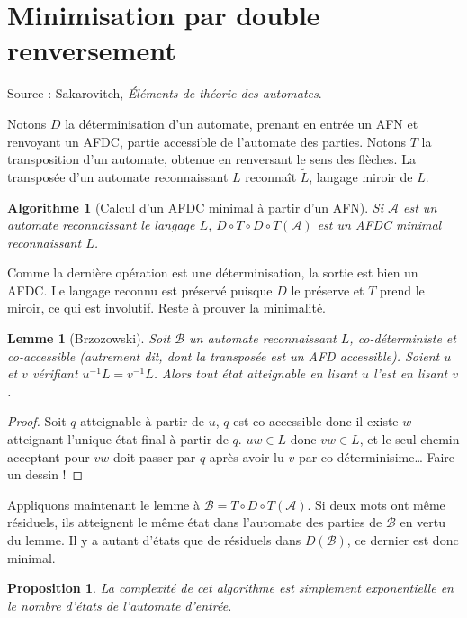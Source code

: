\documentclass[a4paper, 11pt]{article}
\newtheorem*{proposition}{Proposition}
\newtheorem*{algo}{Algorithme}
\newtheorem*{lemma}{Lemme}
\begin{document}
\newpage

\section{Minimisation par double renversement}

Source : Sakarovitch, \emph{Éléments de théorie des automates}.

Notons $D$ la déterminisation d'un automate, prenant en entrée un AFN et
renvoyant un AFDC, partie accessible de l'automate des parties. Notons $T$ la
transposition d'un automate, obtenue en renversant le sens des flèches. La
transposée d'un automate reconnaissant $L$ reconnaît $\tilde{L}$, langage miroir
de $L$.

\begin{algo}[Calcul d'un AFDC minimal à partir d'un AFN]
  Si $\mathcal{A}$ est un automate reconnaissant le langage $L$, $D \circ T
  \circ D \circ T(\mathcal{A})$ est un AFDC minimal reconnaissant $L$.
\end{algo}

Comme la dernière opération est une déterminisation, la sortie est bien un AFDC.
Le langage reconnu est préservé puisque $D$ le préserve et $T$ prend le miroir,
ce qui est involutif. Reste à prouver la minimalité.

\begin{lemma}[Brzozowski]
  Soit $\mathcal{B}$ un automate reconnaissant $L$, \emph{co-déterministe} et
  \emph{co-accessible} (autrement dit, dont la transposée est un AFD
  accessible). Soient $u$ et $v$ vérifiant $u^{-1}L = v^{-1}L$. Alors tout état
  atteignable en lisant $u$ l'est en lisant $v$.
\end{lemma}
\begin{proof}
  Soit $q$ atteignable à partir de $u$, $q$ est co-accessible donc il existe $w$
  atteignant l'unique état final à partir de $q$. $uw \in L$ donc $vw \in L$, et
  le seul chemin acceptant pour $vw$ doit passer par $q$ après avoir lu $v$ par
  co-déterminisime… Faire un dessin !
\end{proof}

Appliquons maintenant le lemme à $\mathcal{B} = T \circ D \circ T(\mathcal{A})$.
Si deux mots ont même résiduels, ils atteignent le même état dans l'automate des
parties de $\mathcal{B}$ en vertu du lemme. Il y a autant d'états que de
résiduels dans $D(\mathcal{B})$, ce dernier est donc minimal.

\begin{proposition}
  La complexité de cet algorithme est simplement exponentielle en le nombre
  d'états de l'automate d'entrée.
\end{proposition}
\end{document}
